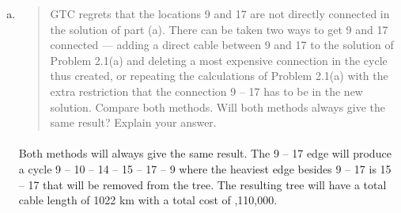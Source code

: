 \begin{enumerate}[(a)]
\begin{figure}[H]
	\centering
	\begin{multicols}{5}
(1,~2), (1,~3), (3,~4), (4,~10), (5,~6), (5,~8), (6,~7), (8,~9), (9,~10), (10,~14), (11,~12), (11,~13), (12,~25), (13,~21), (14,~15), (14,~21), (15,~17), (16,~17), (18,~19), (19,~32), (20,~24), (21,~22), (22,~23), (22,~24), (23,~26), (24,~30), (26,~27), (27,~28), (28,~40), (29,~39), (30,~31), (31,~32), (31,~34), (32,~33), (34,~35), (34,~37), (36,~37), (36,~38), (36,~48), (38,~46), (38,~47), (39,~40), (39,~45), (40,~41), (41,~42), (43,~44), (44,~45), (48,~49), (49,~50)
	\end{multicols}
	\caption{List of connections in a minimum cost communication system}
	\label{mst1}
\end{figure}

\item \begin{quote}GTC regrets that the locations 9 and 17 are not directly connected in the solution
of part (a). There can be taken two ways to get 9 and 17 connected --- adding
a direct cable between 9 and 17 to the solution of Problem 2.1(a) and deleting a
most expensive connection in the cycle thus created, or repeating the calculations
of Problem 2.1(a) with the extra restriction that the connection 9 -- 17 has to be
in the new solution. Compare both methods. Will both methods always give the
same result? Explain your answer.\end{quote}

\paragraph{}
	Both methods will always give the same result. The 9 -- 17 edge will produce a cycle 9 -- 10 -- 14 -- 15 -- 17 -- 9 where the heaviest edge besides 9 -- 17 is 15 -- 17 that will be removed from the tree. The resulting tree will have a total cable length of 1022 km with a total cost of ,110,000.


\end{enumerate}
